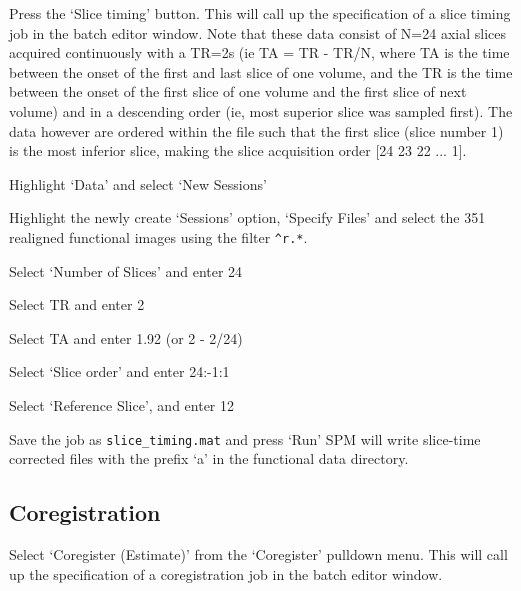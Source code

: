 Press the `Slice timing' button. This will call up the specification of a slice timing job in the batch editor window. Note that these data consist of N=24 axial slices acquired continuously with a TR=2s (ie TA = TR - TR/N, where TA is the time between the onset of the first and last slice of one volume, and the TR is the time between the onset of the first slice of one volume and the first slice of next volume) and in a descending order (ie, most superior slice was sampled first). The data however are ordered within the file such that the first slice (slice number 1) is the most inferior slice, making the slice acquisition order [24 23 22 ... 1].
\bi
\item{Highlight `Data' and select `New Sessions'}
\item{Highlight the newly create `Sessions' option, `Specify Files' and select the
351 realigned functional images using the 
filter \verb!^r.*!.}
\item{Select `Number of Slices' and enter 24}
\item{Select TR and enter 2}
\item{Select TA and enter 1.92 (or 2 - 2/24)}
\item{Select `Slice order' and enter 24:-1:1}
\item{Select `Reference Slice', and enter 12}
\item{Save the job as \verb!slice_timing.mat! and press `Run'}
\ei
SPM will write slice-time corrected files with 
the prefix `a' in the functional data directory.

\subsection{Coregistration}

Select `Coregister (Estimate)' from the `Coregister' pulldown menu. This will call up the specification of a coregistration job in the batch editor 
window. 

